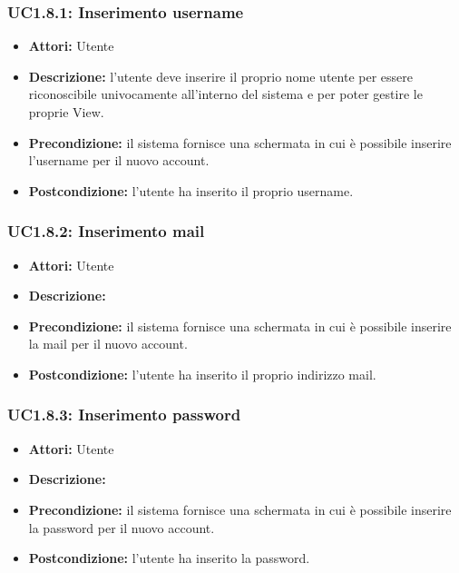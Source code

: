 \subsubsection{UC1.8.1: Inserimento username}

\begin{itemize}
    \item \textbf{Attori:} Utente
    \item \textbf{Descrizione:} l'utente deve inserire il proprio nome utente per essere riconoscibile univocamente all'interno del sistema e per poter gestire le proprie View.
    \item \textbf{Precondizione:} il sistema fornisce una schermata in cui è possibile inserire l'username per il nuovo account.
    \item \textbf{Postcondizione:} l'utente ha inserito il proprio username.
\end{itemize}

\subsubsection{UC1.8.2: Inserimento mail}

\begin{itemize}
    \item \textbf{Attori:} Utente
    \item \textbf{Descrizione:}
    \item \textbf{Precondizione:} il sistema fornisce una schermata in cui è possibile inserire la mail per il nuovo account.
    \item \textbf{Postcondizione:} l'utente ha inserito il proprio indirizzo mail.
\end{itemize}

\subsubsection{UC1.8.3: Inserimento password}

\begin{itemize}
    \item \textbf{Attori:} Utente
    \item \textbf{Descrizione:}
    \item \textbf{Precondizione:} il sistema fornisce una schermata in cui è possibile inserire la password per il nuovo account.
    \item \textbf{Postcondizione:} l'utente ha inserito la password.
\end{itemize}

